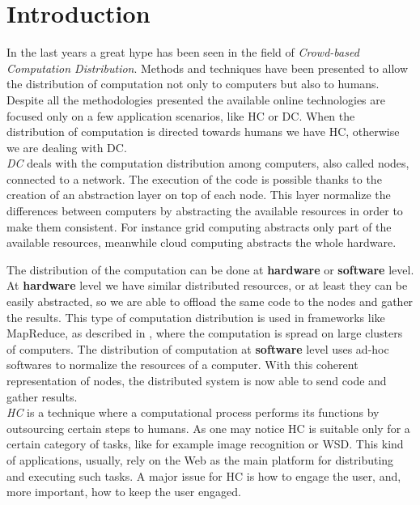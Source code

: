 \cleardoublepage
\chapter{Introduction}
\label{intro}

In the last years a great hype has been seen in the field of \emph{Crowd-based
Computation Distribution}. Methods and techniques have been presented to allow the
distribution of computation not only to computers but also to humans. Despite
all the methodologies presented the available online technologies are focused
only on a few application scenarios, like \acl{HC} or \acl{DC}. When the
distribution of computation is directed towards humans we have \ac{HC},
otherwise we are dealing with \ac{DC}.\\



\emph{\acl{DC}} deals with the computation distribution among computers, also
called nodes, connected to a network. The execution of the code is possible thanks
to the creation of an abstraction layer on top of each node. This layer normalize
the differences between computers by abstracting the available resources in order
to make them consistent. For instance grid computing abstracts only part of the
available resources, meanwhile cloud computing abstracts the whole hardware.

The distribution of the computation can be done at \textbf{hardware} or
\textbf{software} level.
At \textbf{hardware} level we have similar distributed resources, or at least
they can be easily abstracted, so we are able to offload the same code to the
nodes and gather the results. This type of computation distribution is used in
frameworks like MapReduce, as described in \cite{dean2008mapreduce}, where the
computation is spread on large clusters of computers.
The distribution of computation at \textbf{software} level uses ad-hoc softwares
to normalize the resources of a computer. With this coherent representation of
nodes, the distributed system is now able to send code and gather results.\\


\emph{\acl{HC}} is a technique where a computational process performs its
functions by outsourcing certain steps to humans. As one may notice \ac{HC}
is suitable only for a certain category of tasks, like for example image
recognition or \acl{WSD}. This kind of applications, usually, rely on the Web
as the main platform for distributing and executing such tasks. A major issue
for \ac{HC} is how to engage the user, and, more important, how to keep the
user engaged.  \\




